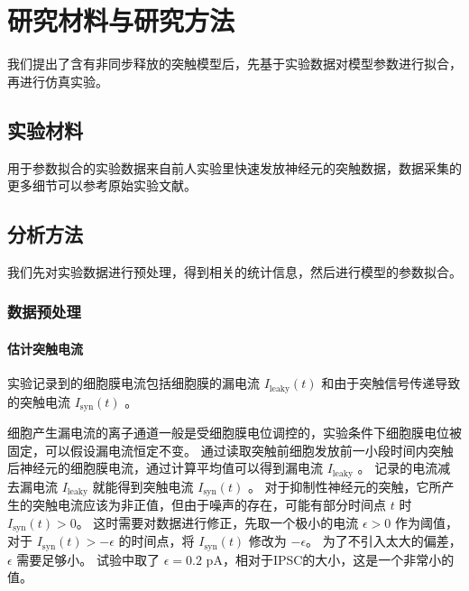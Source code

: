 \chapter{研究材料与研究方法}
\label{chapter:methods}

我们提出了含有非同步释放的突触模型后，先基于实验数据对模型参数进行拟合，再进行仿真实验。

\section{实验材料}
\label{section:methods:materials}

用于参数拟合的实验数据来自前人实验里快速发放神经元的突触数据，数据采集的更多细节可以参考原始实验文献\cite{Jiang2012}。

\section{分析方法}
\label{section:methods:methods}

我们先对实验数据进行预处理，得到相关的统计信息，然后进行模型的参数拟合。

\subsection{数据预处理}
\label{section:methods:data-preprocessing}

\subsubsection{估计突触电流}
实验记录到的细胞膜电流包括细胞膜的漏电流 $I_\text{leaky}(t)$ 和由于突触信号传递导致的突触电流 $I_\text{syn}(t)$ 。

细胞产生漏电流的离子通道一般是受细胞膜电位调控的，实验条件下细胞膜电位被固定，可以假设漏电流恒定不变。
通过读取突触前细胞发放前一小段时间内突触后神经元的细胞膜电流，通过计算平均值可以得到漏电流 $I_\text{leaky}$ 。
记录的电流减去漏电流 $I_\text{leaky}$ 就能得到突触电流 $I_\text{syn}(t)$ 。
对于抑制性神经元的突触，它所产生的突触电流应该为非正值，但由于噪声的存在，可能有部分时间点 $t$ 时 $I_\text{syn}(t) > 0$。
这时需要对数据进行修正，先取一个极小的电流 $\epsilon > 0$ 作为阈值，对于 $I_\text{syn}(t) > -\epsilon$ 的时间点，将 $I_\text{syn}(t)$ 修改为 $-\epsilon$。
为了不引入太大的偏差， $\epsilon$ 需要足够小。
试验中取了 $\epsilon = 0.2$ pA，相对于IPSC的大小，这是一个非常小的值。

